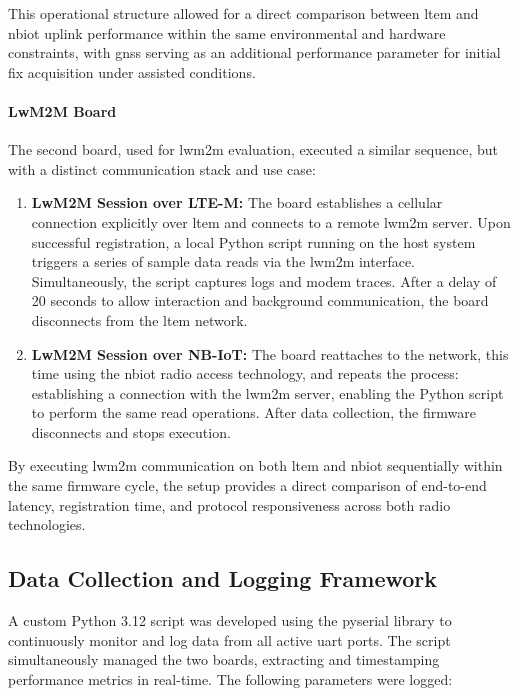 \documentclass[12pt, english, openany]{book}
\begin{document}
This operational structure allowed for a direct comparison between \gls{ltem} and \gls{nbiot} uplink performance within the same environmental and hardware constraints, with \gls{gnss} serving as an additional performance parameter for initial fix acquisition under assisted conditions.

\paragraph{LwM2M Board}

The second board, used for \gls{lwm2m} evaluation, executed a similar sequence, but with a distinct communication stack and use case:

\begin{enumerate}
    \item \textbf{LwM2M Session over LTE-M:}
          The board establishes a cellular connection explicitly over \gls{ltem} and connects to a remote \gls{lwm2m} server. Upon successful registration, a local Python script running on the host system triggers a series of sample data reads via the \gls{lwm2m} interface. Simultaneously, the script captures logs and modem traces. After a delay of 20 seconds to allow interaction and background communication, the board disconnects from the \gls{ltem} network.

    \item \textbf{LwM2M Session over NB-IoT:}
          The board reattaches to the network, this time using the \gls{nbiot} radio access technology, and repeats the process: establishing a connection with the \gls{lwm2m} server, enabling the Python script to perform the same read operations. After data collection, the firmware disconnects and stops execution.
\end{enumerate}

By executing \gls{lwm2m} communication on both \gls{ltem} and \gls{nbiot} sequentially within the same firmware cycle, the setup provides a direct comparison of end-to-end latency, registration time, and protocol responsiveness across both radio technologies.

\subsection{Data Collection and Logging Framework}

A custom Python 3.12 script was developed using the pyserial library to continuously monitor and log data from all active \gls{uart} ports. The script simultaneously managed the two boards, extracting and timestamping performance metrics in real-time. The following parameters were logged:
\end{document}
